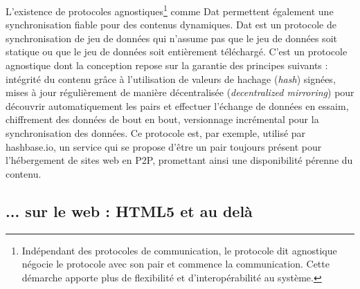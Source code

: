 L'existence de protocoles agnostiques\footnote{Indépendant des 
protocoles de communication, le protocole dit \og agnostique\fg{} négocie le 
protocole avec son pair et commence la communication. Cette démarche 
apporte plus de flexibilité et d'interopérabilité au système.} comme Dat 
\cite{Ogden2017} permettent également une synchronisation fiable pour des 
contenus dynamiques. Dat est un protocole de synchronisation de jeu de données 
qui n'assume pas que le jeu de données soit statique ou que le jeu de données 
soit entièrement téléchargé. C'est un protocole agnostique dont la conception 
repose sur la garantie des principes suivants : intégrité du contenu grâce à 
l'utilisation de valeurs de hachage (\textit{hash}) signées, mises à jour 
régulièrement de manière décentralisée (\textit{decentralized mirroring}) pour 
découvrir automatiquement les pairs et effectuer l'échange de données en 
essaim, chiffrement des données de bout en bout, versionnage incrémental pour la 
synchronisation des données. Ce protocole est, par exemple, utilisé par 
hashbase.io, un service qui se propose d'être un pair toujours présent pour 
l'hébergement de sites web en \gls{P2P}, promettant ainsi une disponibilité 
pérenne du contenu. 


\subsection{... sur le web : HTML5 et au delà}

